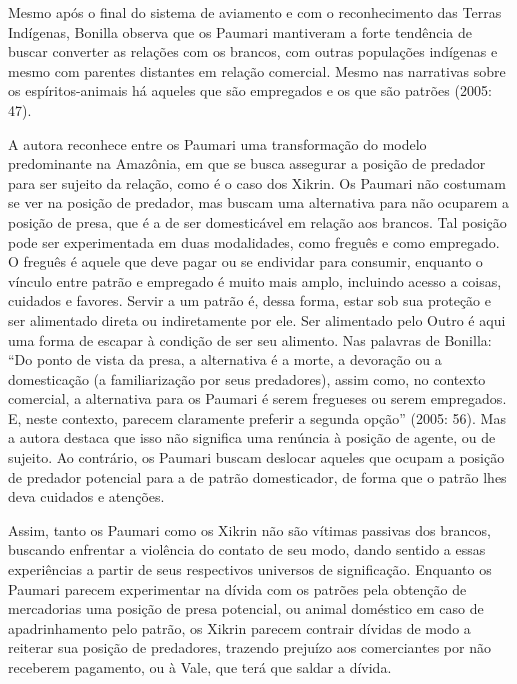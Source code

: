 {Mesmo após o final do sistema de aviamento e com o reconhecimento das
Terras Indígenas, Bonilla observa que os Paumari mantiveram a forte
tendência de buscar converter as relações com os brancos, com outras
populações indígenas e mesmo com parentes distantes em relação
comercial. Mesmo nas narrativas sobre os espíritos-animais há aqueles
que são empregados e os que são patrões (2005: 47).

A autora reconhece entre os Paumari uma transformação do modelo
predominante na Amazônia, em que se busca assegurar a posição de
predador para ser sujeito da relação, como é o caso dos Xikrin. Os
Paumari não costumam se ver na posição de predador, mas buscam uma
alternativa para não ocuparem a posição de presa, que é a de ser
domesticável em relação aos brancos. Tal posição pode ser experimentada
em duas modalidades, como freguês e como empregado. O freguês é aquele
que deve pagar ou se endividar para consumir, enquanto o vínculo entre
patrão e empregado é muito mais amplo, incluindo acesso a coisas,
cuidados e favores. Servir a um patrão é, dessa forma, estar sob sua proteção e
ser alimentado direta ou indiretamente por ele. Ser alimentado pelo
Outro é aqui uma forma de escapar à condição de ser seu alimento. Nas
palavras de Bonilla: ``Do ponto de vista da presa, a alternativa é a
morte, a devoração ou a domesticação (a familiarização por seus
predadores), assim como, no contexto comercial, a alternativa para os
Paumari é serem fregueses ou serem empregados. E, neste contexto,
parecem claramente preferir a segunda opção'' (2005: 56). Mas a autora
destaca que isso não significa uma renúncia à posição de agente, ou de
sujeito. Ao contrário, os Paumari buscam deslocar aqueles que ocupam a
posição de predador potencial para a de patrão domesticador, de forma
que o patrão lhes deva cuidados e atenções. 

Assim, tanto os Paumari como os Xikrin não são vítimas passivas dos
brancos, buscando enfrentar a violência do contato de seu modo, dando
sentido a essas experiências a partir de seus respectivos universos de
significação. Enquanto os Paumari parecem experimentar na dívida com os
patrões pela obtenção de mercadorias uma posição de presa potencial, ou
animal doméstico em caso de apadrinhamento pelo patrão, os Xikrin
parecem contrair dívidas de modo a reiterar sua posição de predadores,
trazendo prejuízo aos comerciantes por não receberem pagamento, ou à
Vale, que terá que saldar a dívida.

}

